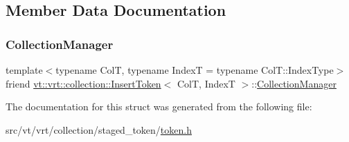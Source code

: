 \subsection{Member Data Documentation}
\mbox{\label{structvt_1_1vrt_1_1collection_1_1_insert_token_a42b6dc06fe8e840dd6ad6c9254b937c3}} 
\subsubsection{\texorpdfstring{Collection\+Manager}{CollectionManager}}
{\footnotesize\ttfamily template$<$typename ColT, typename IndexT = typename Col\+T\+::\+Index\+Type$>$ \\
friend \hyperlink{structvt_1_1vrt_1_1collection_1_1_insert_token}{vt\+::vrt\+::collection\+::\+Insert\+Token}$<$ ColT, IndexT $>$\+::\hyperlink{structvt_1_1vrt_1_1collection_1_1_collection_manager}{Collection\+Manager}}



The documentation for this struct was generated from the following file\+:\begin{DoxyCompactItemize}
\item 
src/vt/vrt/collection/staged\+\_\+token/\hyperlink{token_8h}{token.\+h}\end{DoxyCompactItemize}
